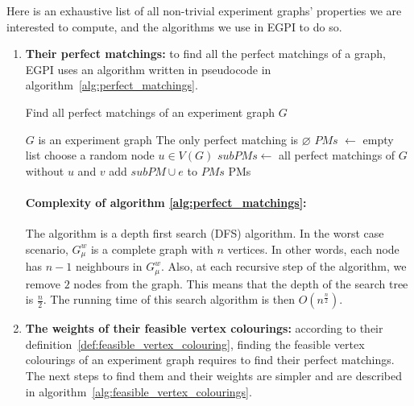 Here is an exhaustive list of all non-trivial experiment graphs' properties we are interested to compute, and the algorithms we use in EGPI to do so.

\begin{enumerate}
    \item \textbf{Their perfect matchings:} to find all the perfect matchings of a graph, EGPI uses an algorithm written in pseudocode in algorithm~\ref{alg:perfect_matchings}.

        \begin{algorithm}
            \caption{Find all perfect matchings of an experiment graph $G$}
            \label{alg:perfect_matchings}
            \begin{algorithmic}
                \Require $G$ is an experiment graph
                    \State The only perfect matching is $\varnothing$
                    \State $PMs$ $\gets$ empty list
                    \State choose a random node $u \in V(G)$
                        \State $subPMs \gets$ all perfect matchings of $G$ without $u$ and $v$
                                \State add $subPM \cup e$ to $PMs$
                            \EndFor
                        \EndFor
                    \EndFor
                \EndIf
                \State \Return PMs
            \end{algorithmic}
        \end{algorithm}

        \paragraph{Complexity of algorithm \ref {alg:perfect_matchings}:}
        The algorithm is a depth first search (DFS) algorithm.
        In the worst case scenario, $G_\mu^w$ is a complete graph with $n$ vertices.
        In other words, each node has $n-1$ neighbours in $G_\mu^w$.
        Also, at each recursive step of the algorithm, we remove $2$ nodes from the graph.
        This means that the depth of the search tree is $\frac{n}{2}$.
        The running time of this search algorithm is then $O\left(n^\frac{n}{2}\right)$. \\

    \item \textbf{The weights of their feasible vertex colourings:} according to their definition~\ref{def:feasible_vertex_colouring}, finding the feasible vertex colourings of an experiment graph requires to find their perfect matchings.
        The next steps to find them and their weights are simpler and are described in algorithm~\ref{alg:feasible_vertex_colourings}.


\end{enumerate}
